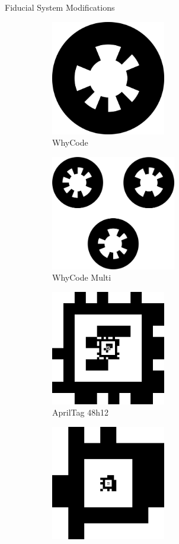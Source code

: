 \documentclass[final, 20pt]{beamer}
\newlength{\colwidth}
\begin{document}
\begin{frame}[t]
\begin{columns}[t]
\begin{column}{\colwidth}
\begin{block}{Fiducial System Modifications}
    \begin{figure}[]
        \centering
        \begin{subfigure}[b]{0.22\linewidth}
            \includegraphics[height=5cm]{./images/whycode_20_8}
            \caption{WhyCode}
            \label{figure:whycode_single}
        \end{subfigure}
        \begin{subfigure}[b]{0.25\linewidth}
            \includegraphics[height=5cm]{./images/whycode_multi}
            \caption{WhyCode Multi}
            \label{figure:whycode_bundle}
        \end{subfigure}
        \begin{subfigure}[b]{0.25\linewidth}
            \includegraphics[height=5cm]{./images/tagCustom48h12_00002_00001_00000}
            \caption{AprilTag 48h12}
            \label{figure:apriltag48h12}
        \end{subfigure}
        \begin{subfigure}[b]{0.25\linewidth}
            \includegraphics[height=5cm]{./images/tagCustom24h10_00002_00001_00000}

\end{subfigure}
\end{figure}
\end{block}
\end{column}
\end{columns}
\end{frame}
\end{document}

